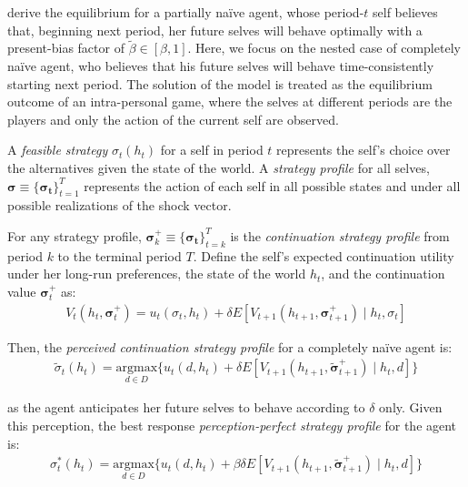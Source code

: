\textcite{FangWang2015} derive the equilibrium for a partially naïve agent, whose period-$t$ self believes that, beginning next period, her future selves will behave optimally with a present-bias factor of $\tilde{\beta} \in [\beta, 1]$. Here, we focus on the nested case of completely naïve agent, who believes that his future selves will behave time-consistently starting next period. The solution of the model is treated as the equilibrium outcome of an intra-personal game, where the selves at different periods are the players and only the action of the current self are observed.

A \textit{feasible strategy} $\sigma_t(h_t)$ for a self in period $t$ represents the self's choice over the alternatives given the state of the world. A \textit{strategy profile} for all selves, $\boldsymbol{\sigma} \equiv \{\boldsymbol{\sigma_t}\}_{t=1}^T$  represents the action of each self in all possible states and under all possible realizations of the shock vector.

For any strategy profile, $\boldsymbol{\sigma}_{k}^{+} \equiv \{\boldsymbol{\sigma_t}\}_{t=k}^T$ is the \textit{continuation strategy profile} from period $k$ to the terminal period $T$.
Define the self's expected continuation utility under her long-run preferences, the state of the world $h_t$, and the continuation value $\boldsymbol{\sigma}_{t}^{+}$ as:
\begin{align}
V_{t}(h_t, \boldsymbol{\sigma}_{t}^{+}) =  
	u_t(\sigma_t, h_t) + 
    	\delta E[V_{t+1}(h_{t+1}, \boldsymbol{\sigma}_{t+1}^{+}) \mid h_t, \sigma_t]
\end{align}          
    
Then, the \textit{perceived continuation strategy profile} for a completely naïve agent is:
\begin{align}
    \tilde{\sigma}_t(h_t) =  
    \underset{d \in D}{\mathrm{argmax}}\{u_t(d, h_t) + 
    \delta E[V_{t+1}(h_{t+1}, \boldsymbol{\tilde{\sigma}}_{t+1}^{+}) \mid h_t, d]\}
\end{align}     

as the agent anticipates her future selves to behave according to $\delta$ only. Given this perception, the best response 
\textit{perception-perfect strategy profile} for the agent is:
\begin{align}
\sigma_t^*(h_t) =  
    \underset{d \in D}{\mathrm{argmax}}\{u_t(d, h_t) + 
    \beta \delta E[V_{t+1}(h_{t+1}, \boldsymbol{\tilde{\sigma}}_{t+1}^{+}) \mid h_t, d]\}
\end{align}

